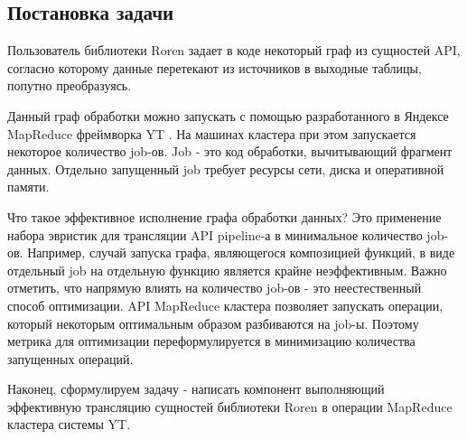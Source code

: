 \subsection{Постановка задачи}

Пользователь библиотеки Roren задает в коде некоторый граф из сущностей API, согласно которому данные перетекают из источников в выходные таблицы, попутно преобразуясь.

Данный граф обработки можно запускать с помощью разработанного в Яндексе MapReduce фреймворка YT \cite{yt}. На машинах кластера при этом запускается некоторое количество job-ов. Job - это код обработки, вычитывающий фрагмент данных. Отдельно запущенный job требует ресурсы сети, диска и оперативной памяти.

Что такое эффективное исполнение графа обработки данных? Это применение набора эвристик для трансляции API pipeline-а в  минимальное количество job-ов. Например, случай запуска графа, являющегося композицией функций, в виде отдельный job на отдельную функцию является крайне неэффективным. Важно отметить, что напрямую влиять на количество job-ов - это неестественный способ оптимизации. API MapReduce кластера позволяет запускать операции, который некоторым оптимальным образом разбиваются на job-ы.  Поэтому метрика для оптимизации переформулируется в минимизацию количества запущенных операций.

Наконец, сформулируем задачу - написать компонент выполняющий эффективную трансляцию сущностей библиотеки Roren в операции MapReduce кластера системы YT.
